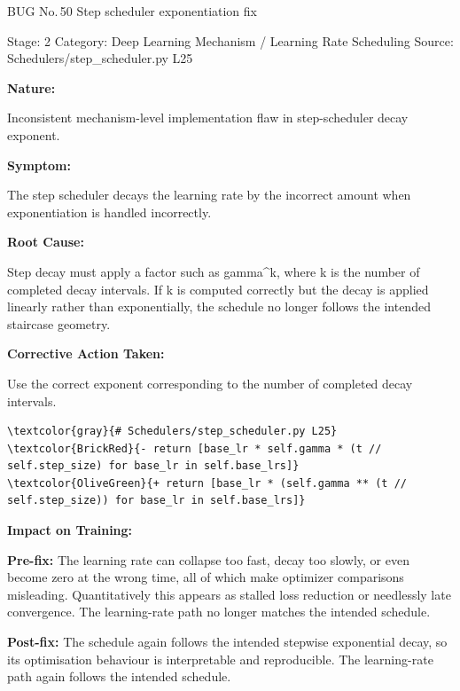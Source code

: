 \documentclass[10pt]{article}
\newcommand{\FieldLabel}[1]{%
 {\bfseries #1:}\par
}
\begin{document}
\begin{bugbox}{BUG No.\,50 \quad Step scheduler exponentiation fix}
{\color{MetaGray}\small Stage: 2 \;\textbar\; Category: Deep Learning Mechanism / Learning Rate Scheduling \;\textbar\; Source: Schedulers/step\_scheduler.py L25\par}
\vspace{0.22em}
\FieldLabel{Nature}
Inconsistent mechanism-level implementation flaw in step-scheduler decay exponent.
\par
\vspace{0.35em}
\FieldLabel{Symptom}
The step scheduler decays the learning rate by the incorrect amount when exponentiation is handled incorrectly.
\par
\vspace{0.35em}
\FieldLabel{Root Cause}
Step decay must apply a factor such as gamma\^{}k, where k is the number of completed decay intervals. If k is computed correctly but the decay is applied linearly rather than exponentially, the schedule no longer follows the intended staircase geometry.
\par
\vspace{0.35em}
\FieldLabel{Corrective Action Taken}
Use the correct exponent corresponding to the number of completed decay intervals.
\par
\vspace{0.35em}
\begin{Verbatim}[commandchars=\\\{\},fontsize=\footnotesize,breaklines=true,breaksymbol={},frame=leftline,framerule=2pt,rulecolor=\color{gray!40},xleftmargin=6pt,formatcom=\singlespacing]
\textcolor{gray}{# Schedulers/step_scheduler.py L25}
\textcolor{BrickRed}{- return [base_lr * self.gamma * (t // self.step_size) for base_lr in self.base_lrs]}
\textcolor{OliveGreen}{+ return [base_lr * (self.gamma ** (t // self.step_size)) for base_lr in self.base_lrs]}
\end{Verbatim}
\vspace{0.22em}
\FieldLabel{Impact on Training}
\textbf{Pre-fix:} The learning rate can collapse too fast, decay too slowly, or even become zero at the wrong time, all of which make optimizer comparisons misleading. Quantitatively this appears as stalled loss reduction or needlessly late convergence. The learning-rate path no longer matches the intended schedule. \par\smallskip
\textbf{Post-fix:} The schedule again follows the intended stepwise exponential decay, so its optimisation behaviour is interpretable and reproducible. The learning-rate path again follows the intended schedule. 
\par
\vspace{0.35em}
\end{bugbox}
\end{document}
